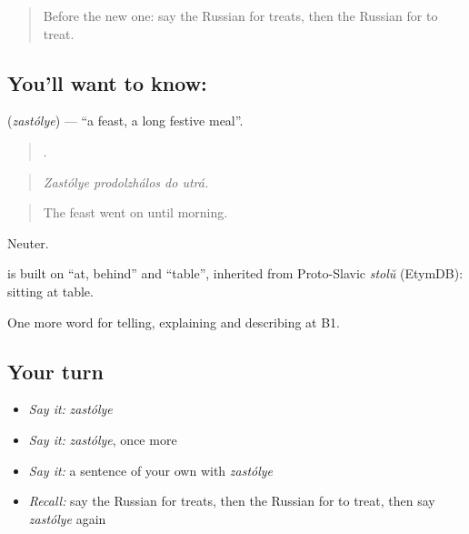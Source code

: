 \label{lesson:RU-C315-zastolye}



\begin{quote}
Before the new one: say the Russian for treats, then the Russian for to treat.
\end{quote}

\subsection*{You'll want to know: }
\textbf{} (\emph{zastólye}) — \textquotedblleft{}a feast, a long festive meal\textquotedblright{}.

\begin{quote}
   .
\end{quote}

\begin{quote}
\emph{Zastólye prodolzhálos do utrá.}
\end{quote}

\begin{quote}
The feast went on until morning.
\end{quote}

Neuter.

\begin{cousinweb}
\emph{} is built on \emph{} \textquotedblleft{}at, behind\textquotedblright{} and \emph{} \textquotedblleft{}table\textquotedblright{}, inherited from Proto-Slavic \emph{stolŭ} (EtymDB): sitting at table.
\end{cousinweb}

\begin{grammarlens}[title={What you've built}]
One more word for telling, explaining and describing at B1.
\end{grammarlens}

\subsection*{Your turn}
\begin{itemize}
\raggedright
  \item \emph{Say it:} \emph{zastólye}
  \item \emph{Say it:} \emph{zastólye}, once more
  \item \emph{Say it:} a sentence of your own with \emph{zastólye}
  \item \emph{Recall:} say the Russian for treats, then the Russian for to treat, then say \emph{zastólye} again
\end{itemize}

